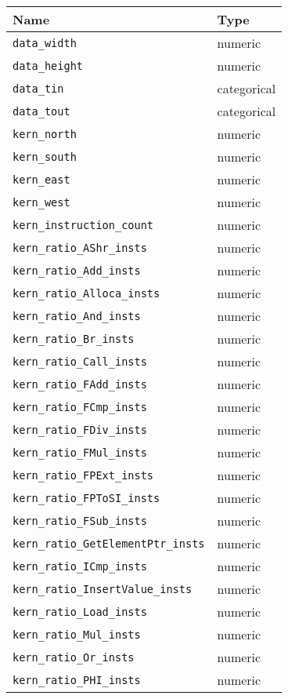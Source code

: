\begin{tabular}{ll}
  \toprule
  Name & Type \\
  \midrule
  \texttt{data\_width} & numeric \\
  \texttt{data\_height} & numeric \\
  \texttt{data\_tin} & categorical \\
  \texttt{data\_tout} & categorical \\
  \texttt{kern\_north} & numeric \\
  \texttt{kern\_south} & numeric \\
  \texttt{kern\_east} & numeric \\
  \texttt{kern\_west} & numeric \\
  \texttt{kern\_instruction\_count} & numeric \\
  \texttt{kern\_ratio\_AShr\_insts} & numeric \\
  \texttt{kern\_ratio\_Add\_insts} & numeric \\
  \texttt{kern\_ratio\_Alloca\_insts} & numeric \\
  \texttt{kern\_ratio\_And\_insts} & numeric \\
  \texttt{kern\_ratio\_Br\_insts} & numeric \\
  \texttt{kern\_ratio\_Call\_insts} & numeric \\
  \texttt{kern\_ratio\_FAdd\_insts} & numeric \\
  \texttt{kern\_ratio\_FCmp\_insts} & numeric \\
  \texttt{kern\_ratio\_FDiv\_insts} & numeric \\
  \texttt{kern\_ratio\_FMul\_insts} & numeric \\
  \texttt{kern\_ratio\_FPExt\_insts} & numeric \\
  \texttt{kern\_ratio\_FPToSI\_insts} & numeric \\
  \texttt{kern\_ratio\_FSub\_insts} & numeric \\
  \texttt{kern\_ratio\_GetElementPtr\_insts} & numeric \\
  \texttt{kern\_ratio\_ICmp\_insts} & numeric \\
  \texttt{kern\_ratio\_InsertValue\_insts} & numeric \\
  \texttt{kern\_ratio\_Load\_insts} & numeric \\
  \texttt{kern\_ratio\_Mul\_insts} & numeric \\
  \texttt{kern\_ratio\_Or\_insts} & numeric \\
  \texttt{kern\_ratio\_PHI\_insts} & numeric \\

\end{tabular}
